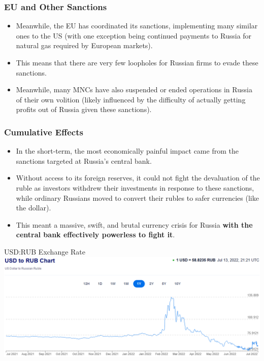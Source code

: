 \documentclass{beamer}
\begin{document}
\begin{frame} 
	\frametitle{\LARGE{EU and Other Sanctions}}
	\begin{itemize}
		\item Meanwhile, the EU has coordinated its sanctions, implementing many similar ones to the US (with one exception being continued payments to Russia for natural gas required by European markets). \pause
		\item This means that there are very few loopholes for Russian firms to evade these sanctions. \pause
		\item Meanwhile, many MNCs have also suspended or ended operations in Russia of their own volition (likely influenced by the difficulty of actually getting profits out of Russia given these sanctions).
	\end{itemize}
\end{frame}

\begin{frame} 
	\frametitle{\LARGE{Cumulative Effects}}
	\begin{itemize}
		\item In the short-term, the most economically painful impact came from the sanctions targeted at Russia's central bank. \pause
		\item Without access to its foreign reserves, it could not fight the devaluation of the ruble as investors withdrew their investments in response to these sanctions, while ordinary Russians moved to convert their rubles to safer currencies (like the dollar). \pause
		\item This meant a massive, swift, and brutal currency crisis for Russia \textbf{with the central bank effectively powerless to fight it}. 
	\end{itemize}
\end{frame}

\begin{frame}{\LARGE USD:RUB Exchange Rate}
	\centering
	\includegraphics[width=\textwidth,height=0.9\textheight,keepaspectratio]{USDRUB.png}
\end{frame}
\end{document}

